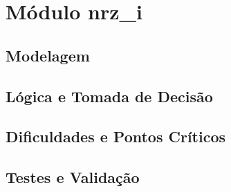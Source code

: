 ﻿%
\section{Módulo nrz_i}
\subsection{Modelagem}
\subsection{Lógica e Tomada de Decisão}
\subsection{Dificuldades e Pontos Críticos}
\subsection{Testes e Validação}


